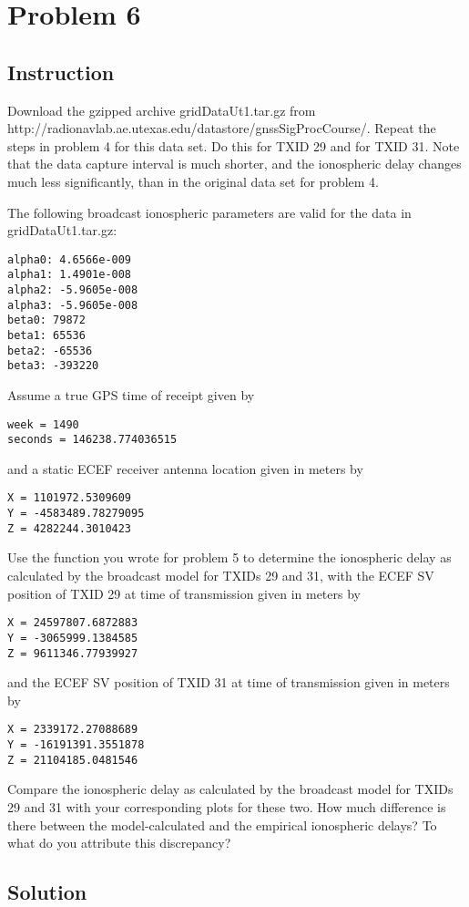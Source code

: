 \section{Problem 6}

\subsection{Instruction}

Download the gzipped archive gridDataUt1.tar.gz from
http://radionavlab.ae.utexas.edu/datastore/gnssSigProcCourse/. Repeat the steps
in problem 4 for this data set. Do this for TXID 29 and for TXID 31. Note that
the data capture interval is much shorter, and the ionospheric delay changes
much less significantly, than in the original data set for problem 4.

The following broadcast ionospheric parameters are valid for the data in
gridDataUt1.tar.gz:

\begin{verbatim}
alpha0: 4.6566e-009
alpha1: 1.4901e-008
alpha2: -5.9605e-008
alpha3: -5.9605e-008
beta0: 79872
beta1: 65536
beta2: -65536
beta3: -393220
\end{verbatim}

Assume a true GPS time of receipt given by

\begin{verbatim}
week = 1490
seconds = 146238.774036515
\end{verbatim}

and a static ECEF receiver antenna location given in meters by

\begin{verbatim}
X = 1101972.5309609
Y = -4583489.78279095
Z = 4282244.3010423
\end{verbatim}

Use the function you wrote for problem 5 to determine the ionospheric delay as
calculated by the broadcast model for TXIDs 29 and 31, with the ECEF SV position
of TXID 29 at time of transmission given in meters by

\begin{verbatim}
X = 24597807.6872883
Y = -3065999.1384585
Z = 9611346.77939927
\end{verbatim}

and the ECEF SV position of TXID 31 at time of transmission given in meters by

\begin{verbatim}
X = 2339172.27088689
Y = -16191391.3551878
Z = 21104185.0481546
\end{verbatim}

Compare the ionospheric delay as calculated by the broadcast model for TXIDs 29
and 31 with your corresponding plots for these two. How much difference is there
between the model-calculated and the empirical ionospheric delays? To what do you
attribute this discrepancy?

\subsection{Solution}


